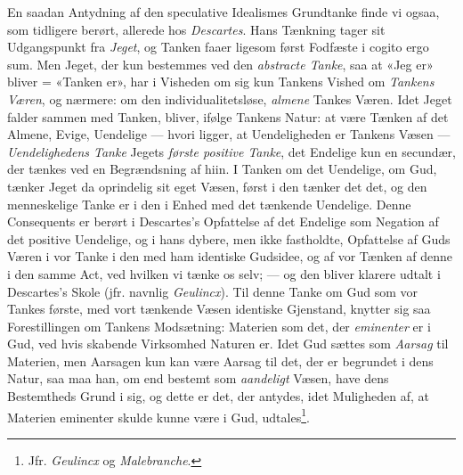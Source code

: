 En saadan Antydning af den speculative Idealismes Grundtanke
finde vi ogsaa, som tidligere berørt, allerede hos \emph{Descartes}.
Hans Tænkning tager sit Udgangspunkt fra \emph{Jeget},
og Tanken faaer ligesom først Fodfæste i cogito ergo sum.
Men Jeget, der kun bestemmes ved den \emph{abstracte Tanke},
saa at «Jeg er» bliver = «Tanken er», har i Visheden om
sig kun Tankens Vished om \emph{Tankens Væren}, og nærmere:
om den individualitetsløse, \emph{almene} Tankes Væren. Idet Jeget
falder sammen med Tanken, bliver, ifølge Tankens Natur: at
være Tænken af det Almene, Evige, Uendelige --- hvori ligger,
at Uendeligheden er Tankens Væsen --- \emph{Uendelighedens
Tanke} Jegets \emph{første positive Tanke}, det Endelige kun
en secundær, der tænkes ved en Begrændsning af hiin. I Tanken
om det Uendelige, om Gud, tænker Jeget da oprindelig
sit eget Væsen, først i den tænker det det, og den menneskelige
Tanke er i den i Enhed med det tænkende Uendelige.
Denne Consequents er berørt i Descartes's Opfattelse af det
Endelige som Negation af det positive Uendelige, og i hans
dybere, men ikke fastholdte, Opfattelse af Guds Væren i vor
Tanke i den med ham identiske Gudsidee, og af vor Tænken
af denne i den samme Act, ved hvilken vi tænke os selv; ---
og den bliver klarere udtalt i Descartes's Skole (jfr. navnlig
\emph{Geulincx}). Til denne Tanke om Gud som vor Tankes første,
med vort tænkende Væsen identiske Gjenstand, knytter sig saa
Forestillingen om Tankens Modsætning: Materien som det,
der \emph{eminenter} er i Gud, ved hvis skabende Virksomhed Naturen
er. Idet Gud sættes som \emph{Aarsag} til Materien, men
Aarsagen kun kan være Aarsag til det, der er begrundet i
dens Natur, saa maa han, om end bestemt som \emph{aandeligt}
 \setcounter{footnote}{0}
Væsen, have dens Bestemtheds Grund i sig, og dette er det, der
antydes, idet Muligheden af, at Materien eminenter skulde
kunne være i Gud, udtales\footnote{Jfr. \emph{Geulincx} og \emph{Malebranche}.}.

